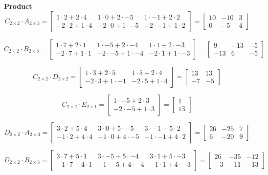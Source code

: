 \documentclass[a4paper]{article}
\begin{document}
\textbf{Product}\\
\[C_{2\times2} \cdot A_{2\times3}=
\begin{bmatrix}
1\cdot2+2\cdot4&1\cdot 0+2\cdot-5&1\cdot-1+2\cdot2\\
-2\cdot2+1\cdot4&-2\cdot0+1\cdot-5&-2\cdot-1+1\cdot2
\end{bmatrix}=
\begin{bmatrix}
10&-10&3\\
0&-5&4
\end{bmatrix}
\]

\[C_{2\times2} \cdot B_{2\times3}=
\begin{bmatrix}
1\cdot7+2\cdot1&1\cdot-5+2\cdot-4&1\cdot1+2\cdot-3\\
-2\cdot7+1\cdot1&-2\cdot-5+1\cdot-4&-2\cdot1+1\cdot-3
\end{bmatrix}=
\begin{bmatrix}
9&-13&-5\\
-13&6&-5
\end{bmatrix}
\]

\[C_{2\times2} \cdot D_{2\times2}=
\begin{bmatrix}
1\cdot3+2\cdot5&1\cdot5+2\cdot4\\
-2\cdot3+1\cdot-1&-2\cdot5+1\cdot4
\end{bmatrix}=
\begin{bmatrix}
13&13\\
-7&-5
\end{bmatrix}
\]

\[C_{2\times2} \cdot E_{2\times1}=
\begin{bmatrix}
1\cdot-5+2\cdot3\\
-2\cdot-5+1\cdot3
\end{bmatrix}=
\begin{bmatrix}
1\\
13
\end{bmatrix}
\]

\[D_{2\times2} \cdot A_{2\times3}=
\begin{bmatrix}
3\cdot2+5\cdot4&3\cdot0+5\cdot-5&3\cdot-1+5\cdot2\\
-1\cdot2+4\cdot4&-1\cdot0+4\cdot-5&-1\cdot-1+4\cdot2
\end{bmatrix}=
\begin{bmatrix}
26&-25&7\\
6&-20&9
\end{bmatrix}
\]

\[D_{2\times2} \cdot B_{2\times3}=
\begin{bmatrix}
3\cdot7+5\cdot1&3\cdot-5+5\cdot-4&3\cdot1+5\cdot-3\\
-1\cdot7+4\cdot1&-1\cdot-5+4\cdot-4&-1\cdot1+4\cdot-3
\end{bmatrix}=
\begin{bmatrix}
26&-35&-12\\
-3&-11&-13
\end{bmatrix}
\]
\end{document}
